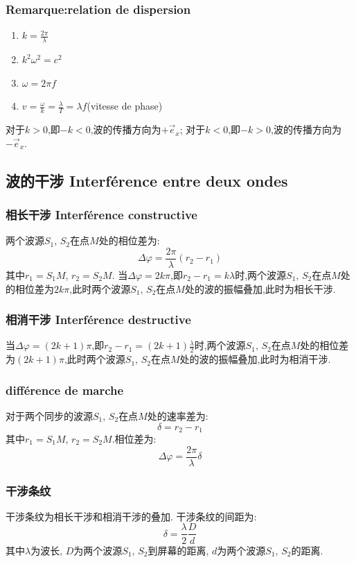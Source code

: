 \documentclass[12pt, a4paper, oneside]{ctexbook}
\newcommand{\e }{\vec{e}}%
\begin{document}
  \subsubsection{Remarque:relation de dispersion}
  \begin{enumerate}
    \item $k=\frac{2\pi}{\lambda}$
    \item $k^2\omega^2=c^2$
    \item $\omega=2\pi f$
    \item $v=\frac{\omega}{k}=\frac{\lambda}{T}=\lambda f$(vitesse de phase)
  \end{enumerate}
  对于$k>0$,即$-k<0$,波的传播方向为$+\e_x$;
  对于$k<0$,即$-k>0$,波的传播方向为$-\e_x$.
  \subsection{波的干涉 Interférence entre deux ondes}
  \subsubsection{相长干涉 Interférence constructive}
  两个波源$S_1,\,S_2$在点$M$处的相位差为:
  $$
  \Delta \varphi=\frac{2\pi}{\lambda}(r_2-r_1)
  $$
  其中$r_1=S_1M$, $r_2=S_2M$.
  当$\Delta \varphi=2k\pi$,即$r_2-r_1=k\lambda$时,两个波源$S_1,\,S_2$在点$M$处的相位差为$2k\pi$,此时两个波源$S_1,\,S_2$在点$M$处的波的振幅叠加,此时为相长干涉.
  \subsubsection{相消干涉 Interférence destructive}
  当$\Delta \varphi=(2k+1)\pi$,即$r_2-r_1=(2k+1)\frac{\lambda}{2}$时,两个波源$S_1,\,S_2$在点$M$处的相位差为$(2k+1)\pi$,此时两个波源$S_1,\,S_2$在点$M$处的波的振幅叠加,此时为相消干涉.

  \subsubsection{différence de marche}
  对于两个同步的波源$S_1,\,S_2$在点$M$处的速率差为:
  $$
  \delta=r_2-r_1
  $$
  其中$r_1=S_1M$, $r_2=S_2M$.相位差为:
  $$
  \Delta \varphi=\frac{2\pi}{\lambda}\delta
  $$
  \subsubsection{干涉条纹}
  干涉条纹为相长干涉和相消干涉的叠加.
  干涉条纹的间距为:
  $$
  \delta=\frac{\lambda}{2}\frac{D}{d}
  $$
  其中$\lambda$为波长,
  $D$为两个波源$S_1,\,S_2$到屏幕的距离,
  $d$为两个波源$S_1,\,S_2$的距离.
\end{document}
